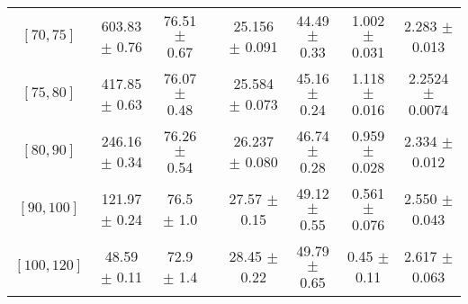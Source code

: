 \begin{tabular}{c||c|c|c|c|c|c|c}
$[70, 75]$ & 603.83 $\pm$ 0.76 & 76.51 $\pm$ 0.67 &  & 25.156 $\pm$ 0.091 & 44.49 $\pm$ 0.33 & 1.002 $\pm$ 0.031 & 2.283 $\pm$ 0.013\\
$[75, 80]$ & 417.85 $\pm$ 0.63 & 76.07 $\pm$ 0.48 &  & 25.584 $\pm$ 0.073 & 45.16 $\pm$ 0.24 & 1.118 $\pm$ 0.016 & 2.2524 $\pm$ 0.0074\\
$[80, 90]$ & 246.16 $\pm$ 0.34 & 76.26 $\pm$ 0.54 &  & 26.237 $\pm$ 0.080 & 46.74 $\pm$ 0.28 & 0.959 $\pm$ 0.028 & 2.334 $\pm$ 0.012\\
$[90, 100]$ & 121.97 $\pm$ 0.24 & 76.5 $\pm$ 1.0 &  & 27.57 $\pm$ 0.15 & 49.12 $\pm$ 0.55 & 0.561 $\pm$ 0.076 & 2.550 $\pm$ 0.043\\
$[100, 120]$ & 48.59 $\pm$ 0.11 & 72.9 $\pm$ 1.4 &  & 28.45 $\pm$ 0.22 & 49.79 $\pm$ 0.65 & 0.45 $\pm$ 0.11 & 2.617 $\pm$ 0.063\\
\end{tabular}
